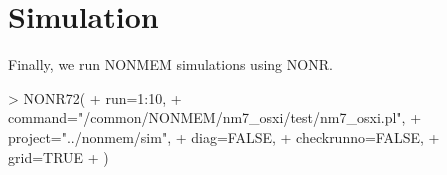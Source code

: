 \section{Simulation}
Finally, we run NONMEM simulations using NONR.
\begin{Schunk}
\begin{Sinput}
> NONR72(
+ 	run=1:10,
+ 	command="/common/NONMEM/nm7_osxi/test/nm7_osxi.pl",
+ 	project="../nonmem/sim",
+ 	diag=FALSE,
+ 	checkrunno=FALSE,
+ 	grid=TRUE
+ )
\end{Sinput}
\end{Schunk}

